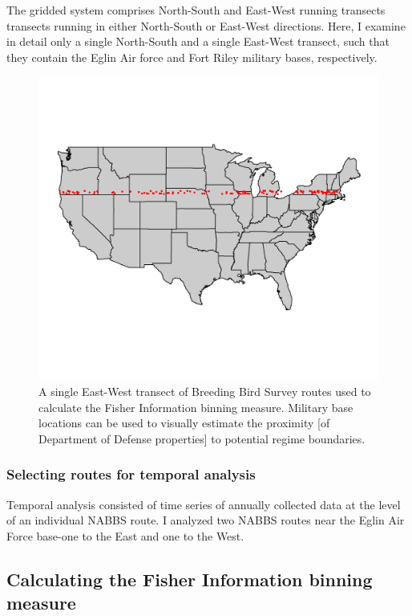 \documentclass[12pt,twoside,openany]{reedthesis}
\begin{document}
The gridded system comprises North-South and East-West running transects
transects running in either North-South or East-West directions. Here, I
examine in detail only a single North-South and a single East-West
transect, such that they contain the Eglin Air force and Fort Riley
military bases, respectively.
\begin{figure}

{\centering \includegraphics[width=0.85\linewidth]{./chapterFiles/fisherSpatial/figures/figsCalledInDiss/transectSamplingEx_row18} 

}

\caption{A single East-West transect of Breeding Bird Survey routes used to calculate the Fisher Information binning measure. Military base locations can be used to visually estimate the proximity [of Department of Defense properties] to potential regime boundaries.}\label{fig:ewRouteMap}
\end{figure}
\subsubsection{Selecting routes for temporal
analysis}\label{selecting-routes-for-temporal-analysis}

Temporal analysis consisted of time series of annually collected data at
the level of an individual NABBS route. I analyzed two NABBS routes near
the Eglin Air Force base-one to the East and one to the West.

\subsection{Calculating the Fisher Information binning
measure}\label{calculating-the-fisher-information-binning-measure}
\end{document}
